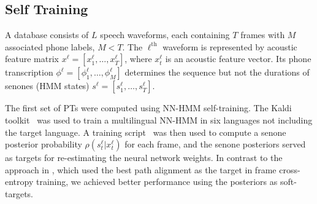 \subsection{Self Training}
\label{sec:selftraining}

A database consists of $L$ speech waveforms, each containing $T$
frames with $M$ associated phone labels, $M<T$. 
The $\ell^{\textrm{th}}$ waveform is represented by acoustic feature
matrix $x^\ell =[x_1^\ell,\ldots,x_T^\ell]$, where $x_t^\ell$ is an
acoustic feature vector.  Its phone transcription
$\phi^\ell=[\phi_1^\ell,\ldots,\phi_M^\ell]$ determines the sequence
but not the durations of senones (HMM states) $s^\ell
=[s_1^\ell,\ldots,s_T^\ell]$.

The first set of PTs were computed using NN-HMM self-training.  The
Kaldi toolkit~\cite{Kaldi2011} was used to train a multilingual NN-HMM
in six languages not including the target language.  A training
script~\cite{vesely2013-semi} was then used to compute a senone
posterior probability $\rho(s_t^\ell|x_t^\ell)$ for each frame, and
the senone posteriors served as targets for re-estimating the neural
network weights.
In contrast to the approach in \cite{vesely2013-semi}, which used the
best path alignment as the target in frame cross-entropy training, we
achieved better performance using the posteriors as soft-targets.
